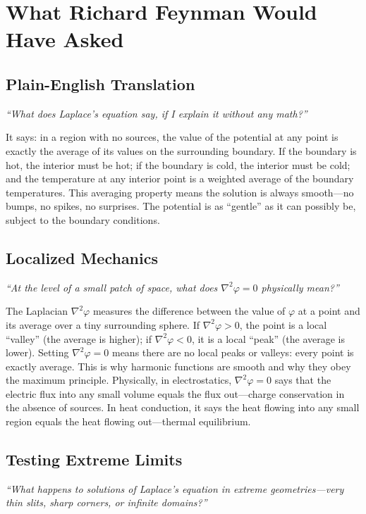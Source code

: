 \documentclass[11pt,openright]{book}
\begin{document}
\section*{What Richard Feynman Would Have Asked}

\subsection*{Plain-English Translation}
\textit{``What does Laplace's equation say, if I explain it without any math?''}

It says: in a region with no sources, the value of the potential at any point is exactly the average of its values on the surrounding boundary. If the boundary is hot, the interior must be hot; if the boundary is cold, the interior must be cold; and the temperature at any interior point is a weighted average of the boundary temperatures. This averaging property means the solution is always smooth---no bumps, no spikes, no surprises. The potential is as ``gentle'' as it can possibly be, subject to the boundary conditions.

\subsection*{Localized Mechanics}
\textit{``At the level of a small patch of space, what does $\nabla^{2}\varphi = 0$ physically mean?''}

The Laplacian $\nabla^{2}\varphi$ measures the difference between the value of $\varphi$ at a point and its average over a tiny surrounding sphere. If $\nabla^{2}\varphi > 0$, the point is a local ``valley'' (the average is higher); if $\nabla^{2}\varphi < 0$, it is a local ``peak'' (the average is lower). Setting $\nabla^{2}\varphi = 0$ means there are no local peaks or valleys: every point is exactly average. This is why harmonic functions are smooth and why they obey the maximum principle. Physically, in electrostatics, $\nabla^{2}\varphi = 0$ says that the electric flux into any small volume equals the flux out---charge conservation in the absence of sources. In heat conduction, it says the heat flowing into any small region equals the heat flowing out---thermal equilibrium.

\subsection*{Testing Extreme Limits}
\textit{``What happens to solutions of Laplace's equation in extreme geometries---very thin slits, sharp corners, or infinite domains?''}
\end{document}
